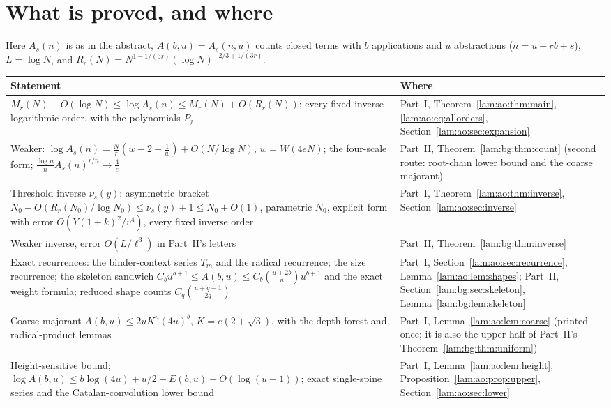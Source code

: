 \documentclass[11pt,a4paper]{article}
\numberwithin{equation}{section}
\theoremstyle{remark}
\begin{document}
\section*{What is proved, and where}\label{lam:sec:status}
Here $A_s(n)$ is as in the abstract, $A(b,u)=A_s(n,u)$ counts closed terms with $b$ applications and $u$ abstractions ($n=u+rb+s$), $L=\log N$, and $R_r(N)=N^{1-1/(3r)}(\log N)^{-2/3+1/(3r)}$.
\begin{center}
\small\renewcommand{\arraystretch}{1.25}
\begin{tabular}{@{}>{\raggedright\arraybackslash}p{} >{\raggedright\arraybackslash}p{}@{}}
\toprule
Statement & Where\\
\midrule
$M_r(N)-O(\log N)\le\log A_s(n)\le M_r(N)+O(R_r(N))$; every fixed inverse-logarithmic order, with the polynomials $P_j$ & Part~I, Theorem~\ref{lam:ao:thm:main}, \eqref{lam:ao:eq:allorders}, Section~\ref{lam:ao:sec:expansion}\\
Weaker: $\log A_s(n)=\frac Nr(w-2+\frac1w)+O(N/\log N)$, $w=W(4eN)$; the four-scale form; $\frac{\log n}nA_s(n)^{r/n}\to\frac4e$ & Part~II, Theorem~\ref{lam:bg:thm:count} (second route: root-chain lower bound and the coarse majorant)\\
Threshold inverse $\nu_s(y)$: asymmetric bracket $N_0-O(R_r(N_0)/\log N_0)\le\nu_s(y)+1\le N_0+O(1)$, parametric $N_0$, explicit form with error $O(Y(1+k)^2/v^4)$, every fixed inverse order & Part~I, Theorem~\ref{lam:ao:thm:inverse}, Section~\ref{lam:ao:sec:inverse}\\
Weaker inverse, error $O(L/\ell^3)$ in Part~II's letters & Part~II, Theorem~\ref{lam:bg:thm:inverse}\\
Exact recurrences: the binder-context series $T_m$ and the radical recurrence; the size recurrence; the skeleton sandwich $C_bu^{b+1}\le A(b,u)\le C_b\binom{u+2b}uu^{b+1}$ and the exact weight formula; reduced shape counts $C_q\binom{u+q-1}{2q}$ & Part~I, Section~\ref{lam:ao:sec:recurrence}, Lemma~\ref{lam:ao:lem:shapes}; Part~II, Section~\ref{lam:bg:sec:skeleton}, Lemma~\ref{lam:bg:lem:skeleton}\\
Coarse majorant $A(b,u)\le2uK^u(4u)^b$, $K=e(2+\sqrt3)$, with the depth-forest and radical-product lemmas & Part~I, Lemma~\ref{lam:ao:lem:coarse} (printed once; it is also the upper half of Part~II's Theorem~\ref{lam:bg:thm:uniform})\\
Height-sensitive bound; $\log A(b,u)\le b\log(4u)+u/2+E(b,u)+O(\log(u+1))$; exact single-spine series and the Catalan-convolution lower bound & Part~I, Lemma~\ref{lam:ao:lem:height}, Proposition~\ref{lam:ao:prop:upper}, Section~\ref{lam:ao:sec:lower}\\

\end{tabular}
\end{center}
\end{document}
